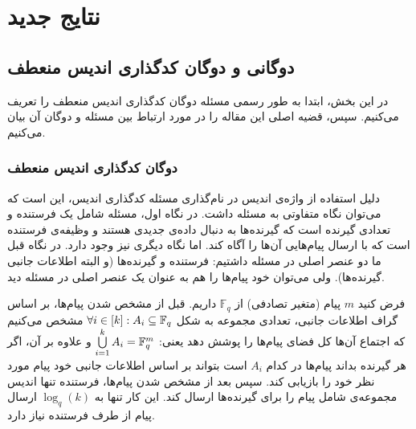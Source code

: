 \section{نتایج جدید}
\label{sec3}
\subsection{
	دوگانی
	\picod
	 و دوگان کدگذاری اندیس منعطف
}
در این بخش، ابتدا به طور رسمی مسئله دوگان کدگذاری اندیس منعطف را تعریف می‌کنیم. سپس، قضیه اصلی این مقاله را در مورد ارتباط بین مسئله 
\picod
 و دوگان آن بیان می‌کنیم.
\subsubsection{
		دوگان کدگذاری اندیس منعطف
}
\begin{recal}
	دلیل استفاده از واژه‌ی اندیس در نام‌گذاری مسئله کدگذاری اندیس، این است که می‌توان نگاه متفاوتی به مسئله داشت. در نگاه اول، مسئله شامل یک فرستنده و تعدادی گیرنده است که گیرنده‌ها به دنبال داده‌ی جدیدی هستند و وظیفه‌ی فرستنده است که با ارسال پیام‌هایی آن‌ها را آگاه کند. اما نگاه دیگری نیز وجود دارد. در نگاه قبل ما دو عنصر اصلی در مسئله داشتیم: فرستنده و گیرنده‌ها (و البته اطلاعات جانبی گیرنده‌ها). ولی می‌توان خود پیام‌ها را هم به عنوان یک عنصر اصلی در مسئله دید.
	
فرض کنید 
$m$
پیام (متغیر‌ تصادفی) از
$\mathbb{F}_q$
 داریم. قبل از مشخص شدن پیام‌ها، بر اساس گراف اطلاعات جانبی، تعدادی مجموعه به شکل
 $\forall i \in [k]: A_i \subseteq \mathbb{F}_q$
 مشخص می‌کنیم که اجتماع آن‌ها کل فضای پیام‌ها را پوشش دهد یعنی:
 $ \bigcup\limits_{i = 1}^k A_i = \mathbb{F}_q^m $
 و علاوه بر آن، اگر هر گیرنده بداند پیام‌ها در کدام
 $A_i$
 است بتواند بر اساس اطلاعات جانبی خود پیام مورد نظر خود را بازیابی کند. سپس بعد از مشخص شدن پیام‌ها، فرستنده تنها اندیس مجموعه‌ی شامل پیام را برای گیرنده‌ها ارسال کند. این کار تنها به
 $\log_q(k)$
 ارسال پیام از طرف فرستنده نیاز دارد.
\end{recal}
